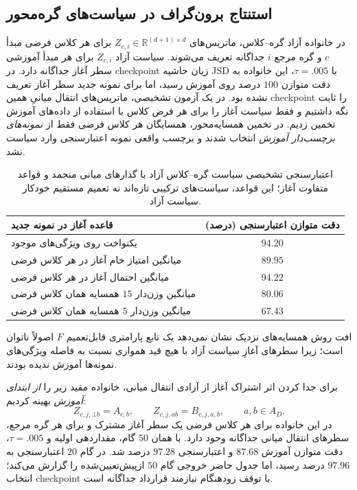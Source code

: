 \subsection{استنتاج برون‌گراف در سیاست‌های گره‌محور}
\label{subsec:ch4-v1-node-class-validation}
در خانواده آزاد گره--کلاس، ماتریس‌های
$Z_{c,i}\in\mathbb R^{(d+1)\times d}$
برای هر کلاس فرضی مبدأ $c$ و گره مرجع $i$
جداگانه تعریف می‌شوند. سیاست آزاد $Z_{c,i}$ برای هر مبدأ آموزشی سطر آغاز
جداگانه دارد. در checkpoint زیان حاشیه JSD با
$\tau=.005$، این خانواده به دقت متوازن
$100$ درصد روی آموزش رسید، اما برای نمونه جدید
سطر آغاز تعریف نشده بود. در یک آزمون تشخیصی،
ماتریس‌های انتقال میانیِ همین checkpoint را ثابت
نگه داشتیم و فقط سیاست آغاز را برای هر فرض کلاس
با استفاده از داده‌های آموزش تخمین زدیم.
در تخمین همسایه‌محور، همسایگان هر کلاس فرضی فقط از
\emph{نمونه‌های برچسب‌دار آموزش} انتخاب شدند و
برچسب واقعی نمونه اعتبارسنجی وارد سیاست نشد.
\begin{table}[htbp]
\centering\small
\caption{اعتبارسنجی تشخیصی سیاست گره--کلاس آزاد با
گذارهای میانی منجمد و قواعد متفاوت آغاز؛
این قواعد، سیاست‌های ترکیبی تازه‌اند نه تعمیم مستقیم
خودکار سیاست آزاد.}
\label{tab:ch4-v1-start-estimators}
\begin{tabular}{lc}\hline
قاعده آغاز در نمونه جدید & دقت متوازن اعتبارسنجی (درصد)\\\hline
یکنواخت روی ویژگی‌های موجود & $94.20$\\
میانگین امتیاز خام آغاز در هر کلاس فرضی & $89.95$\\
میانگین احتمال آغاز در هر کلاس فرضی & $94.22$\\
میانگین وزن‌دار $15$ همسایه همان کلاس فرضی & $80.06$\\
میانگین وزن‌دار $5$ همسایه همان کلاس فرضی & $67.43$\\\hline
\end{tabular}
\end{table}
افت روش همسایه‌های نزدیک نشان نمی‌دهد یک تابع
پارامتری قابل‌تعمیم $F$ اصولاً ناتوان است؛ زیرا
سطرهای آغازِ سیاست آزاد با هیچ قید همواری نسبت به
فاصله ویژگی‌های نمونه‌ها آموزش ندیده بودند.

برای جدا کردن اثر اشتراک آغاز از آزادی انتقال میانی،
خانواده مقید زیر را \emph{از ابتدای آموزش}
بهینه کردیم:
\begin{equation}\label{eq:ch4-v1-class-tied-start}
Z_{c,j,\bot b}=A_{c,b},\qquad
Z_{c,j,ab}=B_{c,j,a,b},
\qquad a,b\in A_D.
\end{equation}
در این خانواده
برای هر کلاس فرضی یک سطر آغاز مشترک و برای هر
گره مرجع، سطرهای انتقال میانی جداگانه وجود دارد.
با همان $50$ گام، مقداردهی اولیه و $\tau=.005$،
دقت متوازن آموزش $87.68$ و اعتبارسنجی $97.28$
درصد شد. در گام $20$ اعتبارسنجی به $97.96$ درصد
رسید، اما جدول حاضر خروجی گام $50$ ازپیش‌تعیین‌شده
را گزارش می‌کند؛ انتخاب checkpoint با توقف زودهنگام
نیازمند قرارداد جداگانه است.

